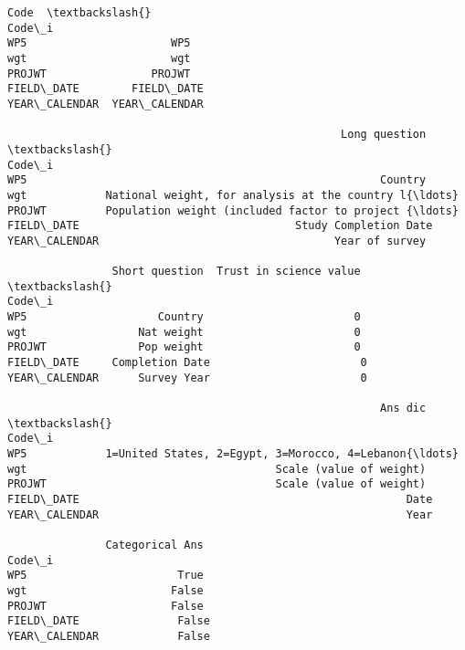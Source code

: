 \documentclass[11pt]{article}
\makeatletter
\newcommand{\boxspacing}{\kern\kvtcb@left@rule\kern\kvtcb@boxsep}
\newcommand{\prompt}[4]{
        {\ttfamily\llap{{\color{#2}[#3]:\hspace{3pt}#4}}\vspace{-\baselineskip}}
    }
\makeatother
\begin{document}
            \begin{tcolorbox}[breakable, size=fbox, boxrule=.5pt, pad at break*=1mm, opacityfill=0]
\prompt{Out}{outcolor}{11}{\boxspacing}
\begin{Verbatim}[commandchars=\\\{\}]
                        Code  \textbackslash{}
Code\_i
WP5                      WP5
wgt                      wgt
PROJWT                PROJWT
FIELD\_DATE        FIELD\_DATE
YEAR\_CALENDAR  YEAR\_CALENDAR

                                                   Long question  \textbackslash{}
Code\_i
WP5                                                      Country
wgt            National weight, for analysis at the country l{\ldots}
PROJWT         Population weight (included factor to project {\ldots}
FIELD\_DATE                                 Study Completion Date
YEAR\_CALENDAR                                    Year of survey

                Short question  Trust in science value  \textbackslash{}
Code\_i
WP5                    Country                       0
wgt                 Nat weight                       0
PROJWT              Pop weight                       0
FIELD\_DATE     Completion Date                       0
YEAR\_CALENDAR      Survey Year                       0

                                                         Ans dic  \textbackslash{}
Code\_i
WP5            1=United States, 2=Egypt, 3=Morocco, 4=Lebanon{\ldots}
wgt                                      Scale (value of weight)
PROJWT                                   Scale (value of weight)
FIELD\_DATE                                                  Date
YEAR\_CALENDAR                                               Year

               Categorical Ans
Code\_i
WP5                       True
wgt                      False
PROJWT                   False
FIELD\_DATE               False
YEAR\_CALENDAR            False
\end{Verbatim}
\end{tcolorbox}
        
    \begin{tcolorbox}[breakable, size=fbox, boxrule=1pt, pad at break*=1mm,colback=cellbackground, colframe=cellborder]
\prompt{In}{incolor}{ }{\boxspacing}
\begin{Verbatim}[commandchars=\\\{\}]

\end{Verbatim}
\end{tcolorbox}
\end{document}
